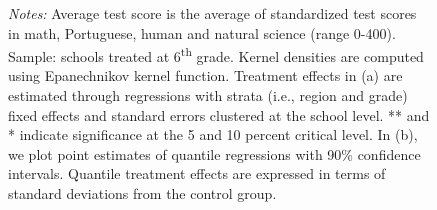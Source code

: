 \documentclass[11pt,a4paper]{article}
\begin{document}
\begin{figure}[htbp]
    \begin{minipage}{0.85\textwidth}
        \small{\textit{Notes:} Average test score is the average of standardized test scores in math, Portuguese, human and natural science (range 0-400). Sample: schools treated at 6\textsuperscript{th} grade. Kernel densities are computed using Epanechnikov kernel function. Treatment effects in (a) are estimated through regressions with strata (i.e., region and grade) fixed effects and standard errors clustered at the school level. ** and * indicate significance at the 5 and 10 percent critical level. In (b), we plot point estimates of quantile regressions with 90\% confidence intervals. Quantile treatment effects are expressed in terms of standard deviations from the control group.}
    \end{minipage}
\end{figure}
\end{document}
